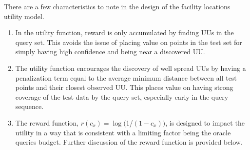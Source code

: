 \documentclass[conference]{IEEEtran}
\begin{document}

There are a few characteristics to note in the design of the facility locations utility model. 
\begin{enumerate}
	\item In the utility function, reward is only accumulated by finding UUs in the query set.  This avoids the issue of placing value on points in the test set for simply having high confidence and being near a discovered UU. 
	\item The utility function encourages the discovery of well spread UUs by having a penalization term equal to the average minimum distance between all test points and their closest observed UU. This places value on having strong coverage of the test data by the query set, especially early in the query sequence. 
	\item The reward function, $r\left(c_x\right) = \log($1/$(1-c_x))$, is designed to impact the utility in a way that is consistent with a limiting factor being the oracle queries budget.  Further discussion of the reward function is provided below. 

\end{enumerate}
\end{document}
